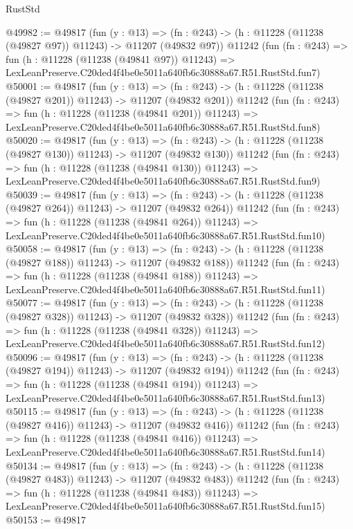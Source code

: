 \begin{lexlean}{RustStd}
\begin{coremodule}
@49982 := @49817
    (fun (y : @13) =>
    (fn : @243) -> (h : @11228 (@11238 (@49827 @97)) @11243) -> @11207 (@49832 @97))
    @11242
    (fun (fn : @243) =>
    fun (h : @11228 (@11238 (@49841 @97)) @11243) =>
    LexLeanPreserve.C20ded4f4be0e5011a640fb6c30888a67.R51.RustStd.fun7)
@50001 := @49817
    (fun (y : @13) =>
    (fn : @243) -> (h : @11228 (@11238 (@49827 @201)) @11243) -> @11207 (@49832 @201))
    @11242
    (fun (fn : @243) =>
    fun (h : @11228 (@11238 (@49841 @201)) @11243) =>
    LexLeanPreserve.C20ded4f4be0e5011a640fb6c30888a67.R51.RustStd.fun8)
@50020 := @49817
    (fun (y : @13) =>
    (fn : @243) -> (h : @11228 (@11238 (@49827 @130)) @11243) -> @11207 (@49832 @130))
    @11242
    (fun (fn : @243) =>
    fun (h : @11228 (@11238 (@49841 @130)) @11243) =>
    LexLeanPreserve.C20ded4f4be0e5011a640fb6c30888a67.R51.RustStd.fun9)
@50039 := @49817
    (fun (y : @13) =>
    (fn : @243) -> (h : @11228 (@11238 (@49827 @264)) @11243) -> @11207 (@49832 @264))
    @11242
    (fun (fn : @243) =>
    fun (h : @11228 (@11238 (@49841 @264)) @11243) =>
    LexLeanPreserve.C20ded4f4be0e5011a640fb6c30888a67.R51.RustStd.fun10)
@50058 := @49817
    (fun (y : @13) =>
    (fn : @243) -> (h : @11228 (@11238 (@49827 @188)) @11243) -> @11207 (@49832 @188))
    @11242
    (fun (fn : @243) =>
    fun (h : @11228 (@11238 (@49841 @188)) @11243) =>
    LexLeanPreserve.C20ded4f4be0e5011a640fb6c30888a67.R51.RustStd.fun11)
@50077 := @49817
    (fun (y : @13) =>
    (fn : @243) -> (h : @11228 (@11238 (@49827 @328)) @11243) -> @11207 (@49832 @328))
    @11242
    (fun (fn : @243) =>
    fun (h : @11228 (@11238 (@49841 @328)) @11243) =>
    LexLeanPreserve.C20ded4f4be0e5011a640fb6c30888a67.R51.RustStd.fun12)
@50096 := @49817
    (fun (y : @13) =>
    (fn : @243) -> (h : @11228 (@11238 (@49827 @194)) @11243) -> @11207 (@49832 @194))
    @11242
    (fun (fn : @243) =>
    fun (h : @11228 (@11238 (@49841 @194)) @11243) =>
    LexLeanPreserve.C20ded4f4be0e5011a640fb6c30888a67.R51.RustStd.fun13)
@50115 := @49817
    (fun (y : @13) =>
    (fn : @243) -> (h : @11228 (@11238 (@49827 @416)) @11243) -> @11207 (@49832 @416))
    @11242
    (fun (fn : @243) =>
    fun (h : @11228 (@11238 (@49841 @416)) @11243) =>
    LexLeanPreserve.C20ded4f4be0e5011a640fb6c30888a67.R51.RustStd.fun14)
@50134 := @49817
    (fun (y : @13) =>
    (fn : @243) -> (h : @11228 (@11238 (@49827 @483)) @11243) -> @11207 (@49832 @483))
    @11242
    (fun (fn : @243) =>
    fun (h : @11228 (@11238 (@49841 @483)) @11243) =>
    LexLeanPreserve.C20ded4f4be0e5011a640fb6c30888a67.R51.RustStd.fun15)
@50153 := @49817

\end{coremodule}
\end{lexlean}
